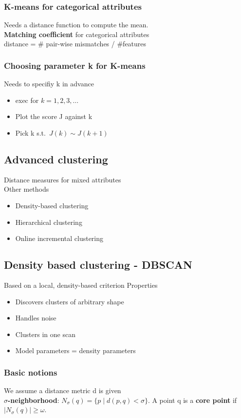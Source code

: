 \subsubsection{K-means for categorical attributes}
Needs a distance function to compute the mean. \\
\textbf{Matching coefficient} for categorical attributes \\
distance = \# pair-wise mismatches / \#features

\subsubsection{Choosing parameter k for K-means}
Needs to specifiy k in advance
\begin{itemize}
\item exec for $ k = 1, 2, 3, \ldots $
\item Plot the score J against k
\item Pick k s.t.\ $ J(k) \sim J(k+1) $
\end{itemize}

\subsection{Advanced clustering}
Distance measures for mixed attributes \\
Other methods
\begin{itemize}
\item Density-based clustering
\item Hierarchical clustering
\item Online incremental clustering
\end{itemize}

\subsection{Density based clustering - DBSCAN}

Based on a local, density-based criterion
Properties
\begin{itemize}
\item Discovers clusters of arbitrary shape
\item Handles noise
\item Clusters in one scan
\item Model parameters = density parameters
\end{itemize}

\subsubsection{Basic notions}
We assume a distance metric d is given\\
\textbf{$ \sigma $-neighborhood}: $ N_\sigma (q) = \{p \mid d(p, q) <
\sigma \}$. A point q is a \textbf{core point} if $ \mid N_\sigma (q)
\mid \geq \omega $. \\

